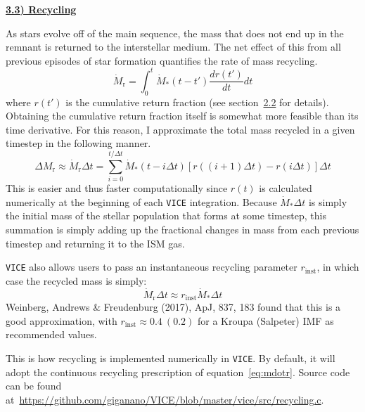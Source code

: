 \documentclass{report}
\begin{document}
\newpage
\noindent 
\begin{center}
\hypertarget{gas:recycling}{
	\underline{\LARGE
		\textbf{3.3) Recycling} 
	}
}
\end{center}
\par\noindent 
As stars evolve off of the main sequence, the mass that does not end up in the 
remnant is returned to the interstellar medium. The net effect of this from 
all previous episodes of star formation quantifies the rate of mass recycling. 
\begin{equation}
\dot{M}_\text{r} = \int_0^t \dot{M}_*(t - t')\frac{dr(t')}{dt}dt 
\end{equation} 
where $r(t')$ is the cumulative return fraction (see 
section~\hyperlink{ssp:crf}{2.2} for details). Obtaining the cumulative return 
fraction itself is somewhat more feasible than its time derivative. For this
reason, I approximate the total mass recycled in a given timestep in the 
following manner. 
\begin{equation}
\label{eq:mdotr}
\Delta M_\text{r} \approx\dot{M}_\text{r}\Delta t = 
\sum_{i = 0}^{t/\Delta t}\dot{M}_*(t - i\Delta t)[r((i + 1)\Delta t) - 
r(i\Delta t)]\Delta t
\end{equation}
This is easier and thus faster computationally since $r(t)$ is calculated 
numerically at the beginning of each \texttt{VICE} integration. Because 
$\dot{M}_*\Delta t$ is simply the initial mass of the stellar population that 
forms at some timestep, this summation is simply adding up the fractional 
changes in mass from each previous timestep and returning it to the ISM gas.
\par
\texttt{VICE} also allows users to pass an instantaneous recycling parameter 
$r_\text{inst}$, in which case the recycled mass is simply: 
\begin{equation}
\dot{M}_\text{r}\Delta t \approx r_\text{inst}\dot{M}_*\Delta t
\end{equation}
Weinberg, Andrews \& Freudenburg (2017), ApJ, 837, 183 found that this is a 
good approximation, with $r_\text{inst} \approx 0.4\ (0.2)$ for a Kroupa 
(Salpeter) IMF as recommended values. 
\par 
This is how recycling is implemented numerically in \texttt{VICE}. By default, 
it will adopt the continuous recycling prescription of equation~\ref{eq:mdotr}. 
Source code can be found 
at~\url{https://github.com/giganano/VICE/blob/master/vice/src/recycling.c}. 

\par 
\end{document}
